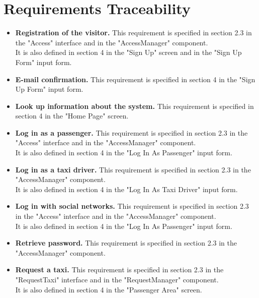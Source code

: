 \documentclass[18pt,oneside,a4paper, titlepage]{article}
\begin{document}
	\section{Requirements Traceability}
		\begin{itemize}
			\item \textbf{Registration of the visitor.} This requirement is specified in section 2.3 in the "Access" interface and in the "AccessManager" component.\\ It is also defined in section 4 in the "Sign Up" screen and in the "Sign Up Form" input form.
			
			\item \textbf{E-mail confirmation.} This requirement is specified in section 4 in the "Sign Up Form" input form.
			
			\item \textbf{Look up information about the system.} This requirement is specified in section 4 in the "Home Page" screen.
			
			\item \textbf{Log in as a passenger.} This requirement is specified in section 2.3 in the "Access" interface and in the "AccessManager" component.\\ It is also defined in section 4 in the "Log In As Passenger" input form.
		
			\item \textbf{Log in as a taxi driver.} This requirement is specified in section 2.3 in the "AccessManager" component.\\ It is also defined in section 4 in the "Log In As Taxi Driver" input form.
		
			\item \textbf{Log in with social networks.} This requirement is specified in section 2.3 in the "Access" interface and in the "AccessManager" component.\\ It is also defined in section 4 in the "Log In As Passenger" input form.
			
			\item \textbf{Retrieve password.} This requirement is specified in section 2.3 in the "AccessManager" component.
			
			\item \textbf{Request a taxi.} This requirement is specified in section 2.3 in the "RequestTaxi" interface and in the "RequestManager" component.\\ It is also defined in section 4 in the "Passenger Area" screen.
			

\end{itemize}
\end{document}
